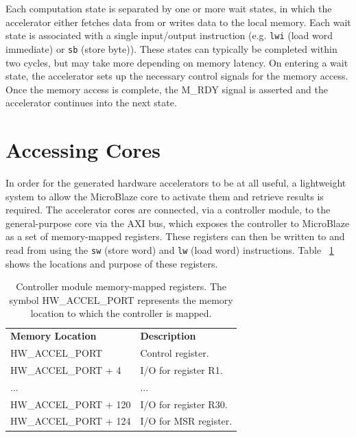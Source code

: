 \documentclass{UoYCSproject}
\begin{document}
Each computation state is separated by one or more wait states, in which the accelerator either fetches data from or writes data
to the local memory. Each wait state is associated with a single input/output instruction
(e.g. \texttt{lwi} (load word immediate) or \texttt{sb} (store byte)). These states can typically be completed within two
cycles, but may take more depending on memory latency. On entering a wait state, the accelerator sets up the necessary control
signals for the memory access. Once the memory access is complete, the M\_RDY signal is asserted and the accelerator continues
into the next state.

\section{Accessing Cores}

In order for the generated hardware accelerators to be at all useful, a lightweight system to allow the MicroBlaze core to
activate them and retrieve results is required. The accelerator cores are connected, via a controller module, to the
general-purpose core via the AXI bus, which exposes the controller to MicroBlaze as a set of memory-mapped registers.
These registers can then be written to and read from using the \texttt{sw} (store word) and \texttt{lw} (load word) instructions.
Table ~\ref{table:controllerRegisters} shows the locations and purpose of these registers.

\begin{table}[H]
\centering
\begin{tabular}{ |p{6cm}|p{7cm} }
\textbf{Memory Location}   & \textbf{Description}        \\
HW\_ACCEL\_PORT            & Control register.         \\[0.05cm]
HW\_ACCEL\_PORT + 4        & I/O for register R1.      \\[0.05cm]
...                        & ...                       \\[0.05cm]
HW\_ACCEL\_PORT + 120      & I/O for register R30.     \\[0.05cm]
HW\_ACCEL\_PORT + 124      & I/O for MSR register.     \\[0.05cm]
\end{tabular}
\caption{Controller module memory-mapped registers. The symbol HW\_ACCEL\_PORT represents the memory location to which the controller is mapped.}
\label{table:controllerRegisters}
\end{table}
\end{document}
